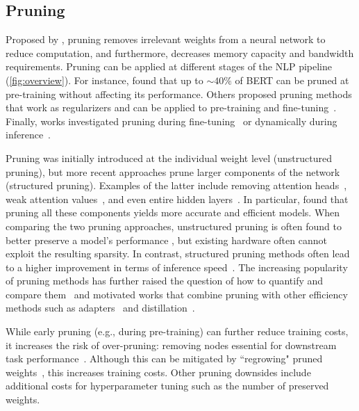 \subsection{Pruning}\label{sec:pruning}
Proposed by \citet{LeCun:1989}, pruning removes irrelevant weights from a neural network to reduce computation, and furthermore, decreases memory capacity and bandwidth requirements. Pruning can be applied at different stages of the NLP pipeline (\ref{fig:overview}).
For instance, \citet{gordon_compressing_2020} found that up to $\sim$$40\%$ of BERT can be pruned at pre-training without affecting its performance. Others proposed pruning methods that work as regularizers and can be applied to pre-training and fine-tuning~\citep{louizos2018learning, wang-etal-2020-structured}. Finally, works investigated pruning during fine-tuning~\citep{han2015learning,sanh_movement_2020} or dynamically during inference~\citep{Fan:2020}.

Pruning was initially introduced at the individual weight level (unstructured pruning), but more recent approaches prune larger components of the network (structured pruning). Examples of the latter include removing attention heads~\citep{voita_analyzing_2019,michel_are_2019},  weak attention values~\citep{ji_distribution_2021,qu_dota_2022}, and even entire hidden layers~\citep{dong2017learning, sajjad_poor_2020}. In particular, \citet{xia-etal-2022-structured} found that pruning all these components yields more accurate and efficient models. When comparing the two pruning approaches, unstructured pruning is often found to better preserve a model's performance \citep{gale2019,ahia-etal-2021-low-resource}, but existing hardware often cannot exploit the resulting sparsity. In contrast, structured pruning methods often lead to a higher improvement in terms of inference speed~\citep{hoefler2021sparsity}. The increasing popularity of pruning methods has further raised the question of how to quantify and compare them~\citep{gale2019,blalock2020state,kaleab2021,hoefler2021sparsity} and motivated works that combine pruning with other efficiency methods such as adapters~\citep{ruckle-etal-2021-adapterdrop} and distillation~\citep{zafrir2021prune}.

While early pruning (e.g., during pre-training) can further reduce training costs, it increases the risk of over-pruning: removing nodes essential for downstream task performance~\citep{gordon_compressing_2020}. Although this can be mitigated by ``regrowing" pruned weights~\citep{ICML-2019-MostafaW}, this increases training costs. Other pruning downsides include additional costs for hyperparameter tuning such as the number of preserved weights.

